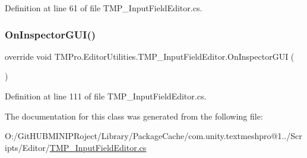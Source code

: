 Definition at line 61 of file T\+M\+P\+\_\+\+Input\+Field\+Editor.\+cs.

\mbox{\label{class_t_m_pro_1_1_editor_utilities_1_1_t_m_p___input_field_editor_a59b111f8284526795f6dcc32a3db65f6}} 
\subsubsection{\texorpdfstring{OnInspectorGUI()}{OnInspectorGUI()}}
{\footnotesize\ttfamily override void T\+M\+Pro.\+Editor\+Utilities.\+T\+M\+P\+\_\+\+Input\+Field\+Editor.\+On\+Inspector\+G\+UI (\begin{DoxyParamCaption}{ }\end{DoxyParamCaption})}



Definition at line 111 of file T\+M\+P\+\_\+\+Input\+Field\+Editor.\+cs.



The documentation for this class was generated from the following file\+:\begin{DoxyCompactItemize}
\item 
O\+:/\+Git\+H\+U\+B\+M\+I\+N\+I\+P\+Roject/\+Library/\+Package\+Cache/com.\+unity.\+textmeshpro@1../\+Scripts/\+Editor/\mbox{\hyperlink{_t_m_p___input_field_editor_8cs}{T\+M\+P\+\_\+\+Input\+Field\+Editor.\+cs}}\end{DoxyCompactItemize}
